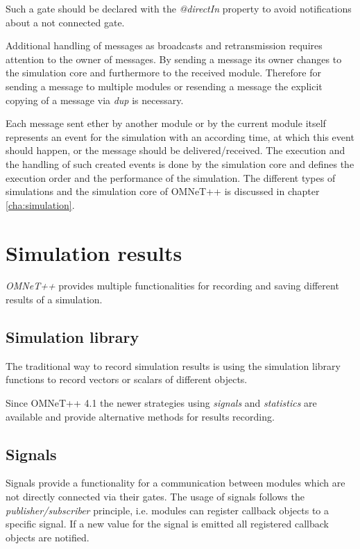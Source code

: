 Such a gate should be declared with the \emph{@directIn} property to avoid notifications about a not connected gate. \cite[section 4.7.5]{omnet_manual}

Additional handling of messages as broadcasts and retransmission requires attention to the owner of messages.
By sending a message its owner changes to the simulation core and furthermore to the received module.
Therefore for sending a message to multiple modules or resending a message the explicit copying of a message via \emph{dup} is necessary. \cite[section 4.7.3]{omnet_manual}


Each message sent ether by another module or by the current module itself represents an event for the simulation with an according time, at which this event should happen, or the message should be delivered/received.
The execution and the handling of such created events is done by the simulation core and defines the execution order and the performance of the simulation.
The different types of simulations and the simulation core of OMNeT++ is discussed in chapter \ref{cha:simulation}.
\section{Simulation results}
\label{sec:omnet_results}
\emph{OMNeT++} provides multiple functionalities for recording and saving different results of a simulation.


\subsection{Simulation library}
\label{sec:omnet_results_sim_lib}
The traditional way to record simulation results is using the simulation library functions to record vectors or scalars of different objects.

Since OMNeT++ 4.1 the newer strategies using \emph{signals} and \emph{statistics} are available and provide alternative methods for results recording.

\subsection{Signals}
\label{sec:omnet_results_signals}
Signals provide a functionality for a communication between modules which are not directly connected via their gates.
The usage of signals follows the \emph{publisher/subscriber} principle, i.e. modules can register callback objects to a specific signal.
If a new value for the signal is emitted all registered callback objects are notified.

